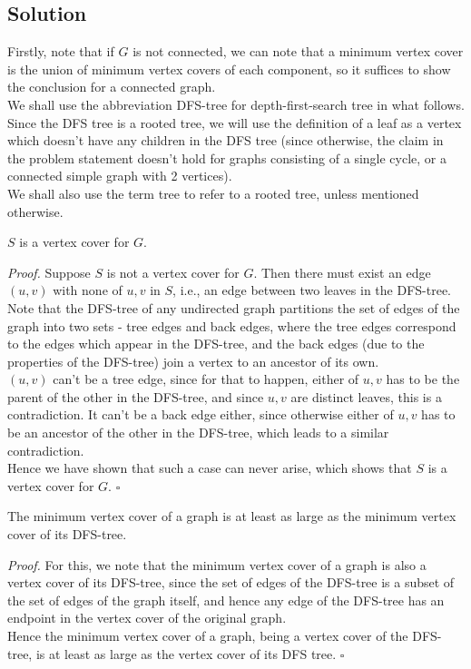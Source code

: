 \documentclass[a4paper]{article}
\newenvironment{proof}{\begin{breakbox}\textit{Proof.}}{\hfill$\square$\end{breakbox}}
\newcommand{\nl}{\vspace{0.2cm}\\}
\begin{document}
\subsection{Solution}
Firstly, note that if $G$ is not connected, we can note that a minimum vertex cover is the union of minimum vertex covers of each component, so it suffices to show the conclusion for a
connected graph.\nl
We shall use the abbreviation DFS-tree for depth-first-search tree in what follows.\nl
Since the DFS tree is a rooted tree, we will use the definition of a leaf as a vertex which doesn't have any children in the DFS tree (since otherwise, the claim in the problem statement doesn't
hold for graphs consisting of a single cycle, or a connected simple graph with 2 vertices).\nl
We shall also use the term tree to refer to a rooted tree, unless mentioned otherwise.\nl
\begin{claim}
    $S$ is a vertex cover for $G$.
\end{claim}
\begin{proof}
    Suppose $S$ is not a vertex cover for $G$. Then there must exist an edge $(u, v)$ with none of $u, v$ in $S$, i.e., an edge between two leaves in the DFS-tree.\nl
    Note that the DFS-tree of any undirected graph partitions the set of edges of the graph into two sets - tree edges and back edges, where the tree edges correspond to the edges which appear in
    the DFS-tree, and the back edges (due to the properties of the DFS-tree) join a vertex to an ancestor of its own.\nl
    $(u, v)$ can't be a tree edge, since for that to happen, either of $u, v$ has to be the parent of the other in the DFS-tree, and since $u, v$ are distinct leaves, this is a contradiction. It can't be a back edge
    either, since otherwise either of $u, v$ has to be an ancestor of the other in the DFS-tree, which leads to a similar contradiction.\nl
    Hence we have shown that such a case can never arise, which shows that $S$ is a vertex cover for $G$.
\end{proof}
\begin{claim}
    The minimum vertex cover of a graph is at least as large as the minimum vertex cover of its DFS-tree.
\end{claim}
\begin{proof}
    For this, we note that the minimum vertex cover of a graph is also a vertex cover of its DFS-tree, since the set of edges of the DFS-tree is a subset of the set of edges of the graph itself, and
    hence any edge of the DFS-tree has an endpoint in the vertex cover of the original graph.\nl
    Hence the minimum vertex cover of a graph, being a vertex cover of the DFS-tree, is at least as large as the vertex cover of its DFS tree.
\end{proof}
\end{document}
